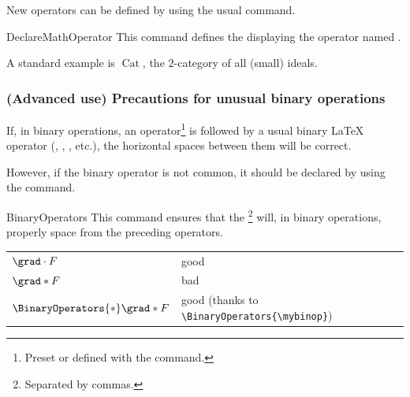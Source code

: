 \documentclass[english,nolocaltoc]{nwejmart}
\newtheorem[style=definition]{fact}
\newtheorem[title-plural=Criteria]{criterion}
\newtheorem[title=random experiment]{rexp}
\DeclareMathOperator{\cat}{Cat}
\newcommand{\mybinop}{\mathbin{*}}
\begin{document}
New operators can be defined by using the usual   command.

\begin{docCommand}{DeclareMathOperator}{}
  This command defines the  displaying the operator
  named .
\end{docCommand}

\begin{preamblecode}
\DeclareMathOperator{\cat}{Cat}
\end{preamblecode}
\begin{bodycode}[listing and text,listing options={deletekeywords={example},deletekeywords={[4]all}}]
A standard example is $\cat$, the $2$-category of all (small) ideals.
\end{bodycode}

\subsubsection{(Advanced use) Precautions for unusual binary operations}

If, in binary  operations, an operator\footnote{Preset or defined with
  the \protect{} command.} is followed by a
usual binary \LaTeX{} operator (,
, , etc.), the horizontal
spaces between them will be correct.

However, if the binary operator is not common, it should be declared by
using the  command.

\begin{docCommand}{BinaryOperators}{}
  This command ensures that the \footnote{Separated
    by commas.} will, in binary operations, properly space from the
  preceding operators.
\end{docCommand}

\begin{preamblecode}[listing options={moretexcs={mybinop}}]
\newcommand{\mybinop}{\mathbin{*}}
\end{preamblecode}
\begin{bodycode}[listing and text,listing options={moretexcs={mybinop}}]
\begin{tabular}{>{$}l<{$}@{ : }l}
  \grad \cdot    F & good     \\
  \grad \mybinop F & bad \\ \BinaryOperators{\mybinop}%
  \grad \mybinop F & good (thanks to \verb+\BinaryOperators{\mybinop}+)
\end{tabular}
\end{bodycode}
\end{document}
